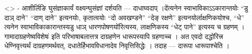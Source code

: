 \textless{}\textgreater{} - आशीर्लिङि घुसंज्ञाकार्यं वक्ष्यन्घुसंज्ञां
दर्शयति --- दाधाघ्वदाप् ।दे॑त्यनेन स्वाभाविकाऽ‌ऽकारान्तयोः ``डु दाञ्
दाने'' ``दाण् दाने'' इत्यनयोः, कृतात्वयोः ``दो अवखण्डने'' ``देङ्
रक्षणे'' इत्यनयोर्लाक्षणिकयोश्च, ``धे'' त्यनेन स्वाभाविकाकारान्तस्यडु
धाञ् धारणपोषणयो॑रित्यस्य, लाक्षणिकस्य ``धेट् पाने'' इत्यस्य च ग्रहणम्
।गामादाग्रहणेष्वविशेषः॑ इति परिभाषाबलात्तत्र दाग्रहणेन धारूपस्यापि
ग्रहणाच्च । अत एवदो दद्धो॑रित्त्र धेण्निवृत्त्यर्थं दाग्रहणमर्थवत्,
दधातेर्हिभावविधानादेव निवृत्तिसिद्धेः । तदाह --- दारूपा धारूपाश्चेति ।
